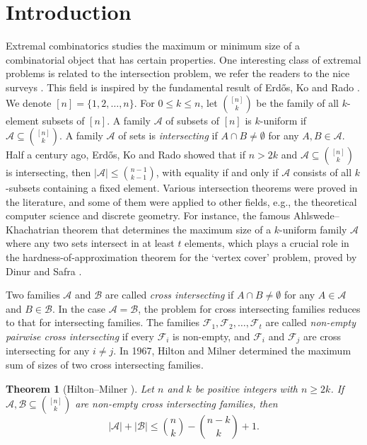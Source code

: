 \documentclass[a4paper,11pt]{article}
\newtheorem{theorem}{Theorem}[section]
\begin{document}
\section{Introduction}
Extremal combinatorics studies the maximum or minimum size of a combinatorial object that has certain properties.  One interesting class of extremal problems is related to the intersection problem, we refer the readers to the nice surveys \cite{FT16, Ellis2021}. This field is inspired by the fundamental  result of Erd\H{o}s, Ko and Rado \cite{EKR1961}.
We denote $[n]=\{1, 2, \dots, n\}$.  For $0\leq k \leq n$, let ${[n]\choose k}$ be the family of all $k$-element subsets of $[n]$.  A family  $\mathcal{A}$ of subsets of $[n]$ is  $k$-uniform if $\mathcal{A}\subseteq {[n]\choose k}$. A family $\mathcal{A}$ of sets is  {\em intersecting} if $A\cap B\ne \emptyset$ for any $A,B\in \mathcal{A}$. Half a century ago, Erd\H{o}s, Ko and Rado \cite{EKR1961} showed that  if $n> 2k$ and $\mathcal{A} \subseteq {[n] \choose k}$ is intersecting, then
$  |\mathcal{A}| \le {n-1 \choose k-1}$,
  with equality if and only if $\mathcal{A}$ consists of all $k$-subsets containing a fixed element.
Various intersection theorems were proved in the literature, and some of them were applied to other fields, e.g., the theoretical computer science and discrete geometry. For instance, the famous Ahlswede--Khachatrian theorem \cite{AK} that determines the maximum size of  a $k$-uniform family $\mathcal{A}$ where any two sets intersect in at least $t$ elements, which plays a crucial role in the hardness-of-approximation theorem for the `vertex cover' problem, proved by Dinur and Safra \cite{DS}.



Two families $\mathcal{A}$ and $\mathcal{B}$  are called {\em cross intersecting} if $A\cap B\ne \emptyset$ for any $A\in \mathcal{A}$ and $B\in \mathcal{B}$. In the case $\mathcal{A}=\mathcal{B}$, the problem for  cross intersecting families  reduces to that for intersecting families.
The families  $\mathcal{F}_1, \mathcal{F}_2,\dots, \mathcal{F}_t$  are called {\it non-empty pairwise cross intersecting} if every $\mathcal{F}_i$ is non-empty, and $\mathcal{F}_i$ and $\mathcal{F}_j$ are cross intersecting for any $ i\neq j $.
In 1967, Hilton and Milner  \cite{HM1967} determined the maximum sum of sizes of two cross intersecting families.

 \begin{theorem}[Hilton--Milner \cite{HM1967}]\label{HM}
Let $n$ and $k$ be positive integers with $n\geq 2k$.
 If $\mathcal{A}, \mathcal{B}\subseteq {[n]\choose k}$ are non-empty cross intersecting families, then
$$
|\mathcal{A}|+|\mathcal{B}|\leq {n\choose k} -{n-k\choose k}+1.
$$
\end{theorem}
\end{document}
